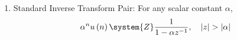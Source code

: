 \begin{enumerate}[label=\thesubsection.\arabic*, ref=\thesubsection.\theenumi,itemsep=0pt]
\item Standard Inverse Transform Pair:
For any scalar constant $\alpha$,
\begin{align}
\alpha^n u\brak{n}\system{Z}\frac{1}{1 - \alpha z^{-1}}, \quad \abs{z} > \abs{\alpha} \label{eq:EE26BTECH11213-z_inv_exponential}
\end{align}
%

\end{enumerate}
